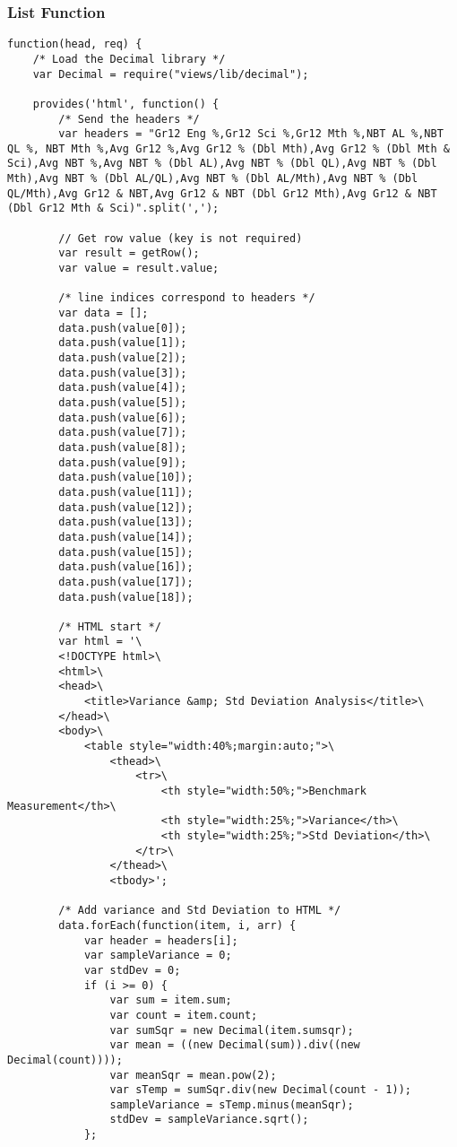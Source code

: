 \subsubsection{List Function}
\label{variance-list-function}
\begin{verbatim}
function(head, req) {
    /* Load the Decimal library */
    var Decimal = require("views/lib/decimal");

    provides('html', function() {
        /* Send the headers */
        var headers = "Gr12 Eng %,Gr12 Sci %,Gr12 Mth %,NBT AL %,NBT QL %, NBT Mth %,Avg Gr12 %,Avg Gr12 % (Dbl Mth),Avg Gr12 % (Dbl Mth & Sci),Avg NBT %,Avg NBT % (Dbl AL),Avg NBT % (Dbl QL),Avg NBT % (Dbl Mth),Avg NBT % (Dbl AL/QL),Avg NBT % (Dbl AL/Mth),Avg NBT % (Dbl QL/Mth),Avg Gr12 & NBT,Avg Gr12 & NBT (Dbl Gr12 Mth),Avg Gr12 & NBT (Dbl Gr12 Mth & Sci)".split(',');

        // Get row value (key is not required)
        var result = getRow();
        var value = result.value;

        /* line indices correspond to headers */
        var data = [];
        data.push(value[0]);
        data.push(value[1]);
        data.push(value[2]);
        data.push(value[3]);
        data.push(value[4]);
        data.push(value[5]);
        data.push(value[6]);
        data.push(value[7]);
        data.push(value[8]);
        data.push(value[9]);
        data.push(value[10]);
        data.push(value[11]);
        data.push(value[12]);
        data.push(value[13]);
        data.push(value[14]);
        data.push(value[15]);
        data.push(value[16]);
        data.push(value[17]);
        data.push(value[18]);

        /* HTML start */
        var html = '\
        <!DOCTYPE html>\
        <html>\
        <head>\
            <title>Variance &amp; Std Deviation Analysis</title>\
        </head>\
        <body>\
            <table style="width:40%;margin:auto;">\
                <thead>\
                    <tr>\
                        <th style="width:50%;">Benchmark Measurement</th>\
                        <th style="width:25%;">Variance</th>\
                        <th style="width:25%;">Std Deviation</th>\
                    </tr>\
                </thead>\
                <tbody>';

        /* Add variance and Std Deviation to HTML */
        data.forEach(function(item, i, arr) {
            var header = headers[i];
            var sampleVariance = 0;
            var stdDev = 0;
            if (i >= 0) {
                var sum = item.sum;
                var count = item.count;
                var sumSqr = new Decimal(item.sumsqr);
                var mean = ((new Decimal(sum)).div((new Decimal(count))));
                var meanSqr = mean.pow(2);
                var sTemp = sumSqr.div(new Decimal(count - 1));
                sampleVariance = sTemp.minus(meanSqr);
                stdDev = sampleVariance.sqrt();
            };


\end{verbatim}
